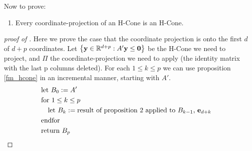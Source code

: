 Now to prove:
\begin{enumerate}
	\item[\Vproj] Every coordinate-projection of an H-Cone is an H-Cone.
\end{enumerate}

\begin{proof}[proof of \Vproj]
	Here we prove the case that the coordinate projection is onto the first $d$ of $d+p$ coordinates.  Let $\left\{\mathbf{y}\in\mathbb{R}^{d+p}:A'\mathbf{y} \leq \mathbf{0}\right\}$ be the H-Cone we need to project, and $\Pi$ the coordinate-projection we need to apply (the identity matrix with the last p columns deleted).  For each $1 \leq k \leq p$ we can use proposition \ref{fm_hcone} in an incremental manner, starting with $A'$.
	\begin{align*}
		 & \text{let } B_0 := A'                                        \\
		 & \text{for } 1 \leq k \leq p                                  \\
		 & \quad \text{let } B_k :=
		\text{result of proposition 2 applied to $B_{k-1}$, $\mathbf{e}_{d+k}$} \\
		 & \text{endfor}                                                \\
		 & \text{return } B_p
	\end{align*}


\end{proof}
